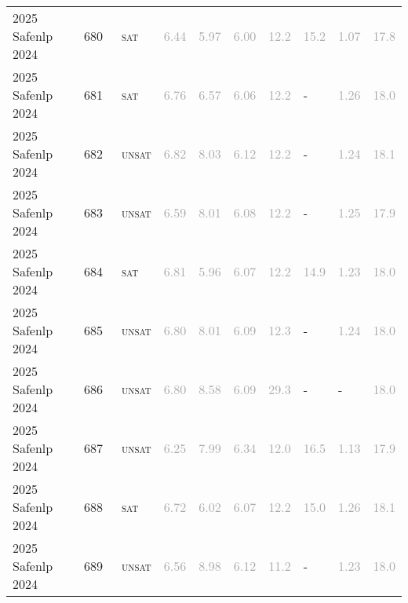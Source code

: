 \begin{center}
{\begin{longtable}{@{}llllllllll@{}}
2025 Safenlp 2024 & 680 & ~\textsc{sat} & \textcolor{darkgray}{6.44} & \textcolor{darkgray}{5.97} & \textcolor{darkgray}{6.00} & \textcolor{darkgray}{12.2} & \textcolor{darkgray}{15.2} & \textcolor{darkgray}{1.07} & \textcolor{darkgray}{17.8} \\
2025 Safenlp 2024 & 681 & ~\textsc{sat} & \textcolor{darkgray}{6.76} & \textcolor{darkgray}{6.57} & \textcolor{darkgray}{6.06} & \textcolor{darkgray}{12.2} & - & \textcolor{darkgray}{1.26} & \textcolor{darkgray}{18.0} \\
2025 Safenlp 2024 & 682 & ~\textsc{unsat} & \textcolor{darkgray}{6.82} & \textcolor{darkgray}{8.03} & \textcolor{darkgray}{6.12} & \textcolor{darkgray}{12.2} & - & \textcolor{darkgray}{1.24} & \textcolor{darkgray}{18.1} \\
2025 Safenlp 2024 & 683 & ~\textsc{unsat} & \textcolor{darkgray}{6.59} & \textcolor{darkgray}{8.01} & \textcolor{darkgray}{6.08} & \textcolor{darkgray}{12.2} & - & \textcolor{darkgray}{1.25} & \textcolor{darkgray}{17.9} \\
2025 Safenlp 2024 & 684 & ~\textsc{sat} & \textcolor{darkgray}{6.81} & \textcolor{darkgray}{5.96} & \textcolor{darkgray}{6.07} & \textcolor{darkgray}{12.2} & \textcolor{darkgray}{14.9} & \textcolor{darkgray}{1.23} & \textcolor{darkgray}{18.0} \\
2025 Safenlp 2024 & 685 & ~\textsc{unsat} & \textcolor{darkgray}{6.80} & \textcolor{darkgray}{8.01} & \textcolor{darkgray}{6.09} & \textcolor{darkgray}{12.3} & - & \textcolor{darkgray}{1.24} & \textcolor{darkgray}{18.0} \\
2025 Safenlp 2024 & 686 & ~\textsc{unsat} & \textcolor{darkgray}{6.80} & \textcolor{darkgray}{8.58} & \textcolor{darkgray}{6.09} & \textcolor{darkgray}{29.3} & - & - & \textcolor{darkgray}{18.0} \\
2025 Safenlp 2024 & 687 & ~\textsc{unsat} & \textcolor{darkgray}{6.25} & \textcolor{darkgray}{7.99} & \textcolor{darkgray}{6.34} & \textcolor{darkgray}{12.0} & \textcolor{darkgray}{16.5} & \textcolor{darkgray}{1.13} & \textcolor{darkgray}{17.9} \\
2025 Safenlp 2024 & 688 & ~\textsc{sat} & \textcolor{darkgray}{6.72} & \textcolor{darkgray}{6.02} & \textcolor{darkgray}{6.07} & \textcolor{darkgray}{12.2} & \textcolor{darkgray}{15.0} & \textcolor{darkgray}{1.26} & \textcolor{darkgray}{18.1} \\
2025 Safenlp 2024 & 689 & ~\textsc{unsat} & \textcolor{darkgray}{6.56} & \textcolor{darkgray}{8.98} & \textcolor{darkgray}{6.12} & \textcolor{darkgray}{11.2} & - & \textcolor{darkgray}{1.23} & \textcolor{darkgray}{18.0} \\

\end{longtable}}
\end{center}
